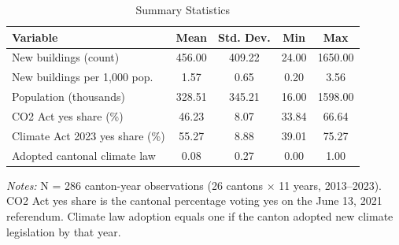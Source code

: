 \begin{table}[H]
\centering
\caption{Summary Statistics}
\begin{threeparttable}
\begin{adjustbox}{max width=\textwidth}
\begin{tabular}{l S[table-format=4.2] S[table-format=3.2] S[table-format=4.2] S[table-format=4.2]}
\toprule
Variable & {Mean} & {Std. Dev.} & {Min} & {Max} \\
\midrule
New buildings (count) & 456.00 & 409.22 & 24.00 & 1650.00 \\
New buildings per 1,000 pop. & 1.57 & 0.65 & 0.20 & 3.56 \\
Population (thousands) & 328.51 & 345.21 & 16.00 & 1598.00 \\
CO2 Act yes share (\%) & 46.23 & 8.07 & 33.84 & 66.64 \\
Climate Act 2023 yes share (\%) & 55.27 & 8.88 & 39.01 & 75.27 \\
Adopted cantonal climate law & 0.08 & 0.27 & 0.00 & 1.00 \\
\bottomrule
\end{tabular}
\end{adjustbox}
\begin{tablenotes}[flushleft]
\small
\item \textit{Notes:} N = 286 canton-year observations (26 cantons $\times$ 11 years, 2013--2023). CO2 Act yes share is the cantonal percentage voting yes on the June 13, 2021 referendum. Climate law adoption equals one if the canton adopted new climate legislation by that year.
\end{tablenotes}
\end{threeparttable}
\label{tab:summary}
\end{table}
